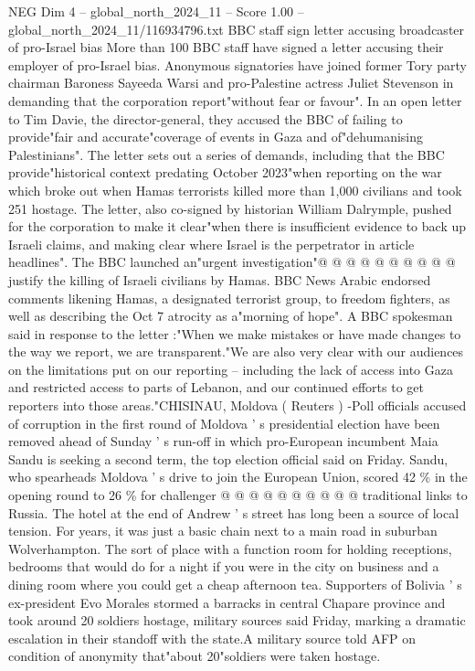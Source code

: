 \begin{textsample}{NEG Dim 4 – global\_north\_2024\_11 – Score 1.00 – global\_north\_2024\_11/116934796.txt}  \label{ex:f4_neg_172}
BBC staff sign letter accusing broadcaster of pro-Israel bias More than 100 BBC staff have signed a letter accusing their employer of pro-Israel bias.
Anonymous signatories have joined former Tory party chairman Baroness Sayeeda Warsi and pro-Palestine actress Juliet Stevenson in demanding that the corporation report"without fear or favour".
In an open letter to Tim Davie, the director-general, they accused the BBC of failing to provide"fair and accurate"coverage of events in Gaza and of"dehumanising Palestinians".
The letter sets out a series of demands, including that the BBC provide"historical context predating October 2023"when reporting on the war which broke out when Hamas terrorists killed more than 1,000 civilians and took 251 hostage.
The letter, also co-signed by historian William Dalrymple, pushed for the corporation to make it clear"when there is insufficient evidence to back up Israeli claims, and making clear where Israel is the perpetrator in article headlines".
The BBC launched an"urgent investigation"@ @ @ @ @ @ @ @ @ @ justify the killing of Israeli civilians by Hamas.
BBC News Arabic endorsed comments likening Hamas, a designated terrorist group, to freedom fighters, as well as describing the Oct 7 atrocity as a"morning of hope".
A BBC spokesman said in response to the letter :"When we make mistakes or have made changes to the way we report, we are transparent."We are also very clear with our audiences on the limitations put on our reporting -- including the lack of access into Gaza and restricted access to parts of Lebanon, and our continued efforts to get reporters into those areas."CHISINAU, Moldova ( Reuters ) -Poll officials accused of corruption in the first round of Moldova ' s presidential election have been removed ahead of Sunday ' s run-off in which pro-European incumbent Maia Sandu is seeking a second term, the top election official said on Friday.
Sandu, who spearheads Moldova ' s drive to join the European Union, scored 42 \% in the opening round to 26 \% for challenger @ @ @ @ @ @ @ @ @ @ traditional links to Russia.
The hotel at the end of Andrew ' s street has long been a source of local tension.
For years, it was just a basic chain next to a main road in suburban Wolverhampton.
The sort of place with a function room for holding receptions, bedrooms that would do for a night if you were in the city on business and a dining room where you could get a cheap afternoon tea.
Supporters of Bolivia ' s ex-president Evo Morales stormed a barracks in central Chapare province and took around 20 soldiers hostage, military sources said Friday, marking a dramatic escalation in their standoff with the state.A military source told AFP on condition of anonymity that"about 20"soldiers were taken hostage.

\end{textsample}
